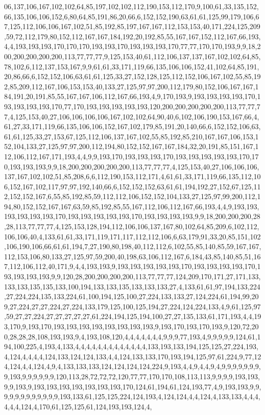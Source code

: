 06,137,106,167,102,102,64,85,197,102,102,112,190,153,112,170,9,100,61,33,135,152,66,135,106,106,152,6,80,64,85,191,86,20,66,6,152,152,190,63,61,61,125,99,179,106,67,125,112,106,106,167,102,51,85,192,85,197,167,167,112,153,153,40,171,224,125,209,59,72,112,179,80,152,112,167,167,184,192,20,192,85,55,167,167,152,112,167,66,193,4,4,193,193,193,170,170,170,193,193,170,193,193,193,170,77,77,170,170,193,9,9,18,200,200,200,200,200,113,77,77,77,9,125,153,40,61,112,106,137,137,167,102,102,64,85,78,102,6,112,137,153,167,9,9,61,61,33,171,119,66,135,106,106,152,41,102,64,85,191,20,86,66,6,152,152,106,63,61,61,125,33,27,152,128,125,112,152,106,167,102,55,85,192,85,209,112,167,106,153,153,40,133,27,125,97,97,200,112,179,80,152,106,167,167,184,191,20,191,85,55,167,167,106,112,167,66,193,4,9,170,193,9,193,193,193,193,170,193,193,193,193,170,77,170,193,193,193,193,193,120,200,200,200,200,200,113,77,77,77,4,125,153,40,27,106,106,106,106,167,102,102,64,90,40,6,102,106,190,153,167,66,4,61,27,33,171,119,66,135,106,106,152,167,102,179,85,191,20,140,66,6,152,152,106,63,61,61,125,33,27,153,67,125,112,106,137,167,102,55,85,192,85,210,167,167,106,153,152,104,133,27,125,97,97,200,112,194,80,152,152,167,167,184,32,20,191,85,151,167,112,106,112,167,171,193,4,4,9,9,193,170,193,193,193,170,193,193,193,193,193,170,170,193,193,193,9,9,18,200,200,200,200,200,113,77,77,77,4,125,153,40,27,106,106,106,137,167,102,102,51,85,208,6,6,112,190,153,112,171,4,61,61,33,171,119,66,135,112,106,152,167,102,117,97,97,192,140,66,6,152,152,152,63,61,61,194,192,27,152,67,125,112,152,152,167,6,55,85,192,85,59,112,112,106,152,152,104,133,27,125,97,99,200,112,194,80,152,152,167,167,63,59,85,192,85,55,167,112,106,112,167,66,193,4,4,9,193,193,193,193,193,193,170,193,193,193,193,193,170,193,193,193,193,9,9,18,200,200,200,28,28,113,77,77,77,4,125,153,128,194,112,106,106,137,167,80,102,64,85,209,6,102,112,106,106,40,4,133,61,61,33,171,119,171,117,112,112,106,6,63,179,91,33,20,85,151,102,106,190,106,66,61,61,194,7,27,190,80,198,40,112,112,6,102,55,85,140,85,59,167,167,112,153,106,80,133,27,125,97,59,200,40,198,63,106,112,167,6,184,43,85,140,85,51,167,112,106,112,40,171,9,4,4,193,193,9,193,193,193,193,193,170,193,193,193,193,170,193,193,193,193,9,9,120,28,200,200,200,200,113,77,77,77,124,209,170,171,27,171,133,133,133,135,135,133,100,194,133,133,135,133,133,133,27,4,133,61,61,97,194,133,224,27,224,224,135,133,224,61,100,194,125,100,27,224,133,133,27,124,224,61,194,99,209,27,224,27,27,224,27,224,133,179,125,100,125,194,27,224,124,224,133,4,9,61,125,97,59,27,27,224,27,27,27,27,27,61,224,194,125,194,100,27,27,135,133,61,171,193,4,4,193,170,9,193,170,193,193,193,193,193,193,193,193,9,193,170,193,170,193,9,120,72,200,28,28,28,108,193,193,9,4,193,108,120,4,4,4,4,4,4,4,9,9,9,77,193,4,9,9,9,9,9,124,61,194,100,225,4,193,4,133,4,4,4,4,4,4,4,4,4,4,4,4,4,133,193,133,194,125,125,27,224,193,4,124,4,4,4,4,124,133,124,124,133,4,4,124,133,133,170,193,194,125,97,61,224,9,77,124,124,4,4,124,4,9,4,133,133,133,124,124,124,124,224,9,193,4,4,9,4,4,9,4,9,9,9,9,9,9,9,9,193,9,9,9,9,9,9,120,113,28,72,72,72,120,77,77,170,170,108,113,113,9,9,9,9,193,193,9,9,193,9,193,193,193,193,193,193,193,170,124,61,194,61,124,193,77,4,9,193,193,9,9,9,9,9,9,9,9,9,9,9,9,193,133,61,125,125,224,124,193,4,124,124,4,4,124,4,133,133,4,4,4,4,4,4,124,4,170,61,125,125,61,124,193,193,124,4,
